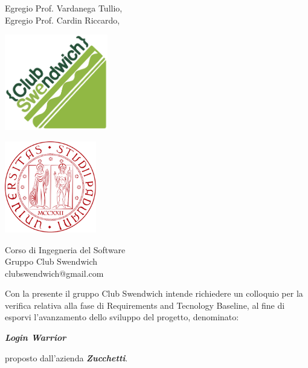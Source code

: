 \documentclass[a4paper, 12pt]{letter}
\begin{document}
    \begin{letter}
        { 	Egregio Prof. Vardanega Tullio,\\
        		Egregio Prof. Cardin Riccardo,}
        \begin{minipage}{.55\textwidth}
            \begin{center}
                \includegraphics[width=4.5cm]{../../assets/ClubSweLogo.png}
            \end{center}
        \end{minipage}
        \begin{minipage}{.3\textwidth}
            \begin{flushright}
                \includegraphics[width=4cm]{../../assets/logoUnipd.png}
            \end{flushright}
        \end{minipage}
        {    
        \begin{center}
            Corso di Ingegneria del Software\\ 
            Gruppo Club Swendwich\\ 
            clubswendwich@gmail.com
        \end{center}
        }
        \opening{ 
        		\hspace{1cm} Con la presente il gruppo Club Swendwich intende richiedere un colloquio per la verifica relativa alla fase di Requirements and Tecnology Baseline, al fine di esporvi l'avanzamento dello sviluppo del progetto, denominato:}
        \begin{center}
           \textbf{\textit{Login Warrior}} 
        \end{center}
        proposto dall'azienda \textbf{\textit{Zucchetti}}.\\

\end{letter}
\end{document}
